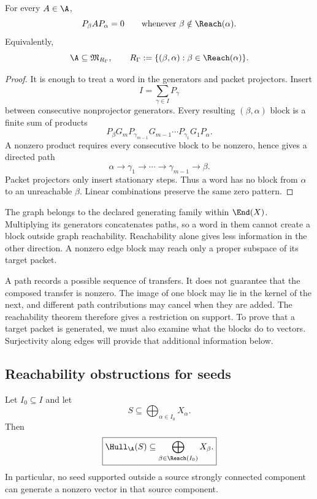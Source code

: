 \begin{theorem}
\label{thm:algebra-reachability-support}
For every $A\in\A$,
\[
P_\beta AP_\alpha=0
\qquad\text{whenever }\beta\notin\Reach(\alpha).
\]
Equivalently,
\[
\A\subseteq\mathfrak M_{R_\Gamma},
\qquad
R_\Gamma:=\{(\beta,\alpha):\beta\in\Reach(\alpha)\}.
\]
\end{theorem}

\begin{proof}
It is enough to treat a word in the generators and packet projectors.  Insert
\[
I=\sum_{\gamma\in I}P_\gamma
\]
between consecutive nonprojector generators.  Every resulting $(\beta,\alpha)$ block is a finite sum of products
\[
P_\beta G_mP_{\gamma_{m-1}}
G_{m-1}\cdots
P_{\gamma_1}G_1P_\alpha.
\]
A nonzero product requires every consecutive block to be nonzero, hence gives a directed path
\[
\alpha\to\gamma_1\to\cdots\to\gamma_{m-1}\to\beta.
\]
Packet projectors only insert stationary steps.  Thus a word has no block from $\alpha$ to an unreachable $\beta$.  Linear combinations preserve the same zero pattern.
\end{proof}

\begin{interpretation}
The graph belongs to the declared generating family within \(\End(X)\).  Multiplying its generators concatenates paths, so a word in them cannot create a block outside graph reachability.  Reachability alone gives less information in the other direction.  A nonzero edge block may reach only a proper subspace of its target packet.
\end{interpretation}


A path records a possible sequence of transfers.  It does not guarantee that the composed transfer is nonzero.  The image of one block may lie in the kernel of the next, and different path contributions may cancel when they are added.  The reachability theorem therefore gives a restriction on support.  To prove that a target packet is generated, we must also examine what the blocks do to vectors.  Surjectivity along edges will provide that additional information below.

\subsection{Reachability obstructions for seeds}
\begin{proposition}
\label{prop:reachability-obstruction}
Let $I_0\subseteq I$ and let
\[
S\subseteq\bigoplus_{\alpha\in I_0}X_\alpha.
\]
Then
\[
\boxed{
\Hull_{\A}(S)
\subseteq
\bigoplus_{\beta\in\Reach(I_0)}X_\beta.
}
\]
In particular, no seed supported outside a source strongly connected component can generate a nonzero vector in that source component.
\end{proposition}

